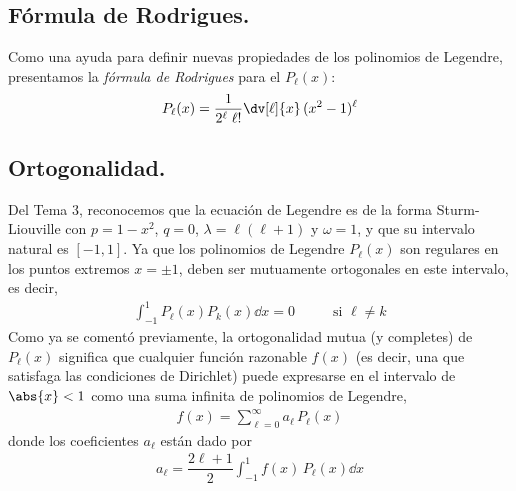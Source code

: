\subsection{Fórmula de Rodrigues.}
Como una ayuda para definir nuevas propiedades de los polinomios de Legendre, presentamos la \emph{fórmula de Rodrigues} para el $P_{\ell} (x)$:
\begin{align}
P_{\ell} (x) = \dfrac{1}{2^{\ell} \; \ell !} \dv[\ell]{x} \, (x^{2} - 1)^{\ell}
\label{eq:ecuacion_18_09}
\end{align}
\subsection{Ortogonalidad.}
Del Tema 3, reconocemos que la ecuación de Legendre es de la forma Sturm-Liouville con $p = 1 - x^{2}$, $q = 0$, $\lambda = \ell (\ell + 1)$ y $\omega = 1$, y que su intervalo natural es $[-1, 1]$. Ya que los polinomios de Legendre $P_{\ell} (x)$ son regulares en los puntos extremos $x = \pm 1$, deben ser mutuamente ortogonales en este intervalo, es decir,
\begin{align}
\int_{-1}^{1} P_{\ell}(x) P_{k}(x) \dd{x} = 0 \hspace{1cm} \mbox{ si $\ell \neq k$}
\label{eq:ecuacion_18_12}
\end{align}
Como ya se comentó previamente, la ortogonalidad mutua (y completes) de $P_{\ell} (x)$ significa que cualquier función razonable $f(x)$ (es decir, una que satisfaga las condiciones de Dirichlet) puede expresarse en el intervalo de $\abs{x} < 1$ como una suma infinita de polinomios de Legendre,
\begin{align}
f(x) = \sum_{\ell = 0}^{\infty} a_{\ell} \, P_{\ell} (x)
\label{eq:ecuacion_013}
\end{align}
donde los coeficientes $a_{\ell}$ están dado por
\begin{align}
a_{\ell} = \dfrac{2 \ell + 1}{2} \int_{-1}^{1} f(x) \, P_{\ell} (x) \dd{x}
\label{eq:ecuacion_18_14}
\end{align}
